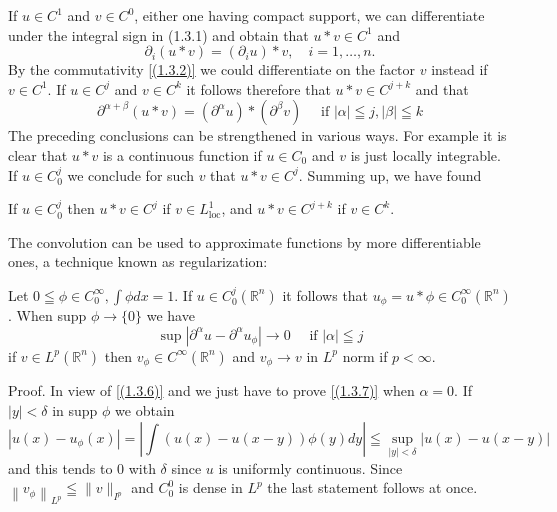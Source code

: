 If $u \in C^{1}$ and $v \in C^{0}$, either one having compact support, we can differentiate under the integral sign in (1.3.1) and obtain that $u * v \in C^{1}$ and
\begin{equation}
    \label{(1.3.5)}
	\partial_{i}(u * v)=\left(\partial_{i} u\right) * v, \quad i=1, \ldots, n .
\end{equation}
By the commutativity \eqref{(1.3.2)} we could differentiate on the factor $v$ instead if $v \in C^{1}$. If $u \in C^{j}$ and $v \in C^{k}$ it follows therefore that $u * v \in C^{j+k}$ and that
\begin{equation}
    \label{(1.3.6)}
    \partial^{\alpha+\beta}(u * v)=\left(\partial^{\alpha} u\right) *\left(\partial^{\beta} v\right) \quad \text{ if } |\alpha| \leqq j,|\beta| \leqq k
\end{equation}
The preceding conclusions can be strengthened in various ways. For example it is clear that $u * v$ is a continuous function if $u \in C_{0}$ and $v$ is just locally integrable. If $u \in C_{0}^{j}$ we conclude for such $v$ that $u * v \in C^{j}$. Summing up, we have found
\begin{theorem}
    If $u \in C_{0}^{j}$ then $u * v \in C^{j}$ if $v \in L_{\mathrm{loc}}^{1}$, and $u * v \in C^{j+k}$ if $v \in C^{k}$.
\end{theorem}
The convolution can be used to approximate functions by more differentiable ones, a technique known as regularization:
\begin{theorem}
    Let $0 \leqq \phi \in C_{0}^{\infty}, \int \phi d x=1$. If $u \in C_{0}^{j}\left(\mathbb{R}^{n}\right)$ it follows that $u_{\phi}=u * \phi \in C_{0}^{\infty}\left(\mathbb{R}^{n}\right)$. When supp $\phi \rightarrow\{0\}$ we have
\begin{equation}
    \label{(1.3.7)}
	\sup \left|\partial^{\alpha} u-\partial^{\alpha} u_{\phi}\right| \rightarrow 0 \quad \text { if }|\alpha| \leqq j
\end{equation}
if $v \in L^{p}\left(\mathbb{R}^{n}\right)$ then $v_{\phi} \in C^{\infty}\left(\mathbb{R}^{n}\right)$ and $v_{\phi} \rightarrow v$ in $L^{p}$ norm if $p<\infty$.
\end{theorem}
Proof. In view of \eqref{(1.3.6)} and  we just have to prove \eqref{(1.3.7)} when $\alpha=0$. If $|y|<\delta$ in supp $\phi$ we obtain
\[
	\left|u(x)-u_{\phi}(x)\right|=\left|\int(u(x)-u(x-y)) \phi(y) d y\right| \leqq \sup _{|y|<\delta}|u(x)-u(x-y)|
\]
and this tends to 0 with $\delta$ since $u$ is uniformly continuous. Since $\left\|v_{\phi}\right\|_{L^{p}} \leqq\|v\|_{I^{p}}$ and $C_{0}^{0}$ is dense in $L^{p}$ the last statement follows at once.

